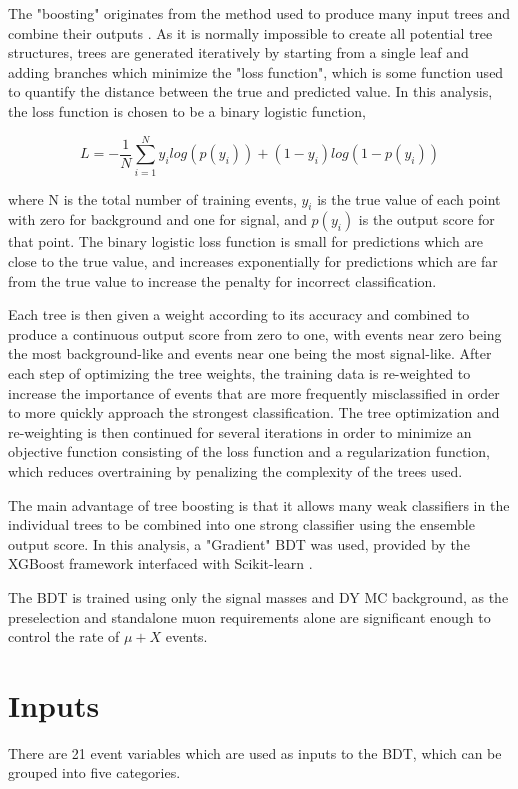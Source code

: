 The "boosting" originates from the method used to produce many input trees and combine their outputs \cite{GradBoost}. 
As it is normally impossible to create all potential tree structures, trees are generated iteratively by starting from a single leaf and adding branches which minimize the "loss function", which is some function used to quantify the distance between the true and predicted value.
In this analysis, the loss function is chosen to be a binary logistic function,

\begin{equation}
	\label{binLogFunc}
	L = - \frac{1}{N} \sum_{i=1}^{N} y_i log(p(y_i)) + (1-y_i) log(1-p(y_i))
\end{equation} 

where N is the total number of training events, $y_i$ is the true value of each point with zero for background and one for signal, and $p(y_i)$ is the output score for that point.
The binary logistic loss function is small for predictions which are close to the true value, and increases exponentially for predictions which are far from the true value to increase the penalty for incorrect classification.

Each tree is then given a weight according to its accuracy and combined to produce a continuous output score from zero to one, with events near zero being the most background-like and events near one being the most signal-like. 
After each step of optimizing the tree weights, the training data is re-weighted to increase the importance of events that are more frequently misclassified in order to more quickly approach the strongest classification.
The tree optimization and re-weighting is then continued for several iterations in order to minimize an objective function consisting of the loss function and a regularization function, which reduces overtraining by penalizing the complexity of the trees used.

The main advantage of tree boosting is that it allows many weak classifiers in the individual trees to be combined into one strong classifier using the ensemble output score.
In this analysis, a "Gradient" BDT was used, provided by the XGBoost framework \cite{XGBoost} interfaced with Scikit-learn \cite{scikit}. 

The BDT is trained using only the signal masses and DY MC background, as the preselection and standalone muon requirements alone are significant enough to control the rate of $\mu+X$ events. 

\section{Inputs}
There are 21 event variables which are used as inputs to the BDT, which can be grouped into five categories.

